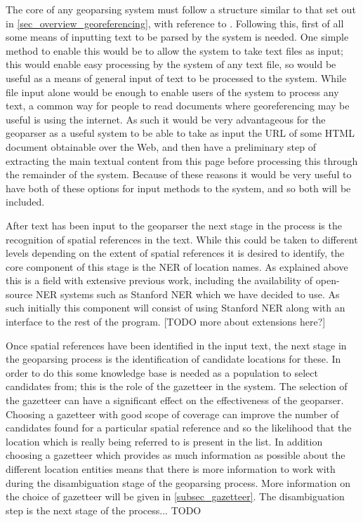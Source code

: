 \documentclass[12pt, a4paper]{report}
\begin{document}

The core of any geoparsing system must follow a structure similar to that set out in \ref{sec_overview_georeferencing}, with reference to \citet{hill2006}. Following this, first of all some means of inputting text to be parsed by the system is needed. One simple method to enable this would be to allow the system to take text files as input; this would enable easy processing by the system of any text file, so would be useful as a means of general input of text to be processed to the system. While file input alone would be enough to enable users of the system to process any text, a common way for people to read documents where georeferencing may be useful is using the internet. As such it would be very advantageous for the geoparser as a useful system to be able to take as input the URL of some HTML document obtainable over the Web, and then have a preliminary step of extracting the main textual content from this page before processing this through the remainder of the system. Because of these reasons it would be very useful to have both of these options for input methods to the system, and so both will be included.

After text has been input to the geoparser the next stage in the process is the recognition of spatial references in the text. While this could be taken to different levels depending on the extent of spatial references it is desired to identify, the core component of this stage is the NER of location names. As explained above this is a field with extensive previous work, including the availability of open-source NER systems such as Stanford NER which we have decided to use. As such initially this component will consist of using Stanford NER along with an interface to the rest of the program. [TODO more about extensions here?]

Once spatial references have been identified in the input text, the next stage in the geoparsing process is the identification of candidate locations for these. In order to do this some knowledge base is needed as a population to select candidates from; this is the role of the gazetteer in the system. The selection of the gazetteer can have a significant effect on the effectiveness of the geoparser. Choosing a gazetteer with good scope of coverage can improve the number of candidates found for a particular spatial reference and so the likelihood that the location which is really being referred to is present in the list. In addition choosing a gazetteer which provides as much information as possible about the different location entities means that there is more information to work with during the disambiguation stage of the geoparsing process. More information on the choice of gazetteer will be given in \ref{subsec_gazetteer}. The disambiguation step is the next stage of the process... TODO
\end{document}

